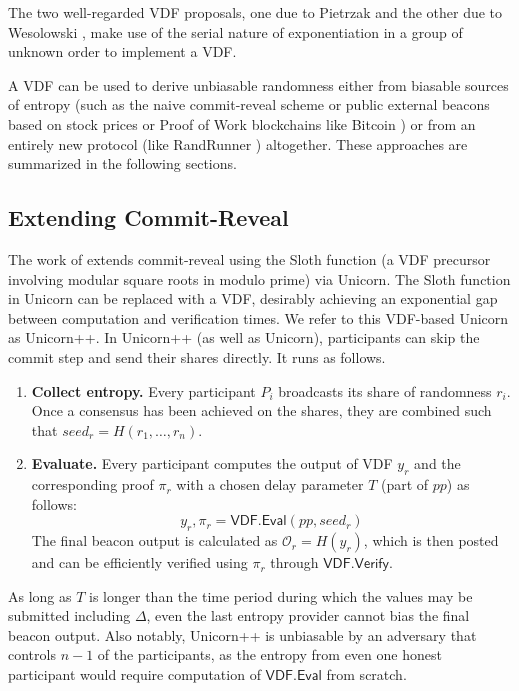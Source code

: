 \documentclass[letterpaper,twocolumn,10pt]{article}
\theoremstyle{definition}
\theoremstyle{remark}
\begin{document}
The two well-regarded VDF proposals, one due to Pietrzak \cite{pietrzak2018simple} and the other due to Wesolowski \cite{wesolowski2019efficient}, make use of the serial nature of exponentiation in a group of unknown order to implement a VDF.

A VDF can be used to derive unbiasable randomness either from biasable sources of entropy (such as the naive commit-reveal scheme or public external beacons based on stock prices or Proof of Work blockchains like Bitcoin \cite{nakamoto2019bitcoin}) or from an entirely new protocol (like RandRunner \cite{schindler2021randrunner}) altogether. These approaches are summarized in the following sections.

\subsection{Extending Commit-Reveal}
\label{subsection:extending-commit-reveal}
The work of \cite{lenstra2015random} extends commit-reveal using the Sloth function (a VDF precursor involving modular square roots in modulo prime) via Unicorn. The Sloth function in Unicorn can be replaced with a VDF, desirably achieving an exponential gap between computation and verification times. We refer to this VDF-based Unicorn as Unicorn++. In Unicorn++ (as well as Unicorn), participants can skip the commit step and send their shares directly. It runs as follows.
\begin{enumerate}
    \item \textbf{Collect entropy.} Every participant $P_i$ broadcasts its share of randomness $r_i$. Once a consensus has been achieved on the shares, they are combined such that $seed_r = H(r_1,\ldots, r_n)$.
    \item \textbf{Evaluate.} Every participant computes the output of VDF $y_r$ and the corresponding proof $\pi_r$ with a chosen delay parameter $T$ (part of $pp$) as follows:
    $$y_r, \pi_r = \mathsf{VDF.Eval}(pp, seed_r)$$
    The final beacon output is calculated as $\mathcal{O}_r = H(y_r) $, which is then posted and can be efficiently verified using $\pi_r$ through $\mathsf{VDF.Verify}$.
\end{enumerate}
As long as $T$ is longer than the time period during which the values may be submitted including $\Delta$, even the last entropy provider cannot bias the final beacon output. Also notably, Unicorn++ is unbiasable by an adversary that controls $n - 1$ of the participants, as the entropy from even one honest participant would require computation of $\mathsf{VDF.Eval}$ from scratch.
\end{document}
